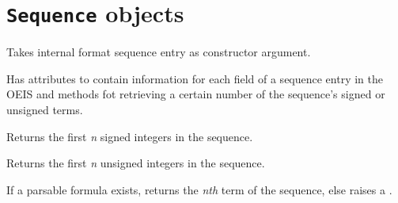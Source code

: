 \documentclass[letterpaper,10pt,english]{sphinxmanual}
\begin{document}
\section{\texttt{Sequence} objects}
\label{api:sequence-objects}

\begin{fulllineitems}
\label{api:sequence.Sequence}
Takes internal format sequence entry as constructor argument.

Has attributes to contain information for each field of a
sequence entry in the OEIS and methods fot retrieving a certain
number of the sequence's signed or unsigned terms.

\begin{fulllineitems}
\label{api:sequence.Sequence.signed}
Returns the first \emph{n} signed integers in the sequence.

\end{fulllineitems}


\begin{fulllineitems}
\label{api:sequence.Sequence.unsigned}
Returns the first \emph{n} unsigned integers in the sequence.

\end{fulllineitems}


\end{fulllineitems}


\begin{fulllineitems}
\label{api:generate}
If a parsable formula exists, returns the \emph{nth} term of the sequence, else
raises a {\hyperref[api:errors.NoFunctionError]{\emph{}}}.

\end{fulllineitems}
\end{document}
